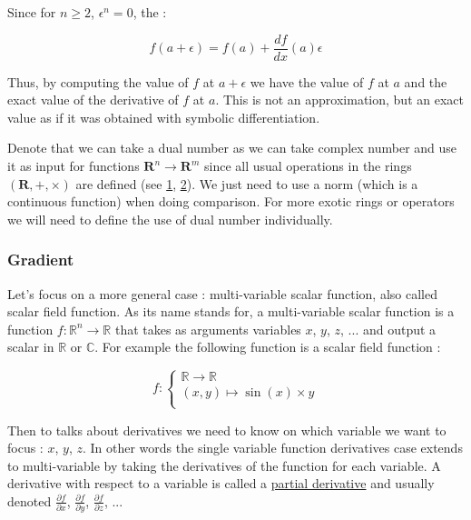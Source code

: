 \documentclass[12pt]{article}
\begin{document}
Since for $n \geq 2$, $\epsilon^n = 0$, the :

$$
f(a+\epsilon) = f(a) + \frac{df}{dx}(a) \epsilon
$$

Thus, by computing the value of $f$ at $a+\epsilon$ we have the value of $f$ at $a$ and the exact value of the derivative of $f$ at $a$. This is not an approximation, but an exact value as if it was obtained with symbolic differentiation.

Denote that we can take a dual number as we can take complex number and use it as input for functions $\mathbf{R}^n \rightarrow \mathbf{R}^m$ since all usual operations in the rings $(\mathbf{R},+, \times)$ are defined (see \href{ttps://math.stackexchange.com/questions/464262/why-is-there-never-a-proof-that-extending-the-reals-to-the-complex-numbers-will}{1}, \href{https://www.arctbds.com/volume4/arctbds_submission_28.pdf}{2}). We just need to use a norm (which is a continuous function) when doing comparison.
For more exotic rings or operators we will need to define the use of dual number individually.

\subsubsection{Gradient}

Let's focus on a more general case : multi-variable scalar function, also called scalar field function. As its name stands for, a multi-variable scalar function is a function $f : \mathbb{R}^n \rightarrow \mathbb{R}$ that takes as arguments variables $x$, $y$, $z$, ... and output a scalar in $\mathbb{R}$ or $\mathbb{C}$. For example the following function is a scalar field function :

$$
f : 
\begin{cases}
\mathbb{R} \rightarrow \mathbb{R} \\
(x, y) \mapsto \sin(x) \times y \\
\end{cases}
$$

Then to talks about derivatives we need to know on which variable we want to focus : $x$, $y$, $z$. In other words the single variable function derivatives case extends to multi-variable by taking the derivatives of the function for each variable. A derivative with respect to a variable is called a \href{https://en.wikipedia.org/wiki/Partial_derivative}{partial derivative} and usually denoted $\frac{\partial{f}}{\partial{x}}$, $\frac{\partial{f}}{\partial{y}}$, $\frac{\partial{f}}{\partial{z}}$, ...
\end{document}
